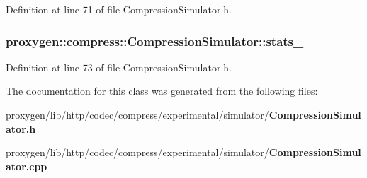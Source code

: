 Definition at line 71 of file Compression\+Simulator.\+h.

\subsubsection[{stats\+\_\+}]{ proxygen\+::compress\+::\+Compression\+Simulator\+::stats\+\_\+\hspace{0.3cm}{\ttfamily [private]}}\label{classproxygen_1_1compress_1_1CompressionSimulator_aa38d3dd39bf4ad68347a3668899aa9ed}


Definition at line 73 of file Compression\+Simulator.\+h.



The documentation for this class was generated from the following files\+:\begin{DoxyCompactItemize}
\item 
proxygen/lib/http/codec/compress/experimental/simulator/{\bf Compression\+Simulator.\+h}\item 
proxygen/lib/http/codec/compress/experimental/simulator/{\bf Compression\+Simulator.\+cpp}\end{DoxyCompactItemize}
